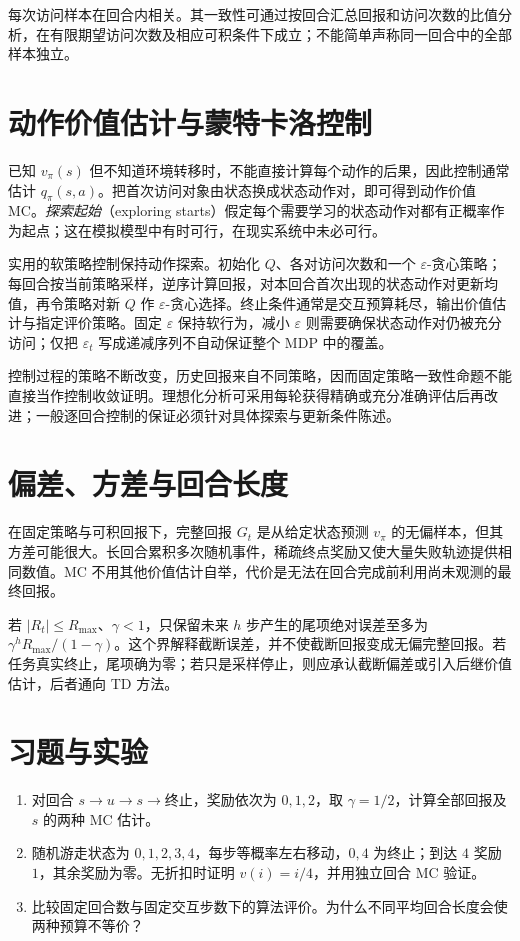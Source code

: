 \documentclass[UTF8,12pt,a4paper,fontset=fandol]{ctexbook}
\begin{document}
每次访问样本在回合内相关。其一致性可通过按回合汇总回报和访问次数的比值分析，在有限期望访问次数及相应可积条件下成立；不能简单声称同一回合中的全部样本独立。

\section{动作价值估计与蒙特卡洛控制}

已知 $v_\pi(s)$ 但不知道环境转移时，不能直接计算每个动作的后果，因此控制通常估计 $q_\pi(s,a)$。把首次访问对象由状态换成状态动作对，即可得到动作价值 MC。\emph{探索起始}（exploring starts）假定每个需要学习的状态动作对都有正概率作为起点；这在模拟模型中有时可行，在现实系统中未必可行。

实用的软策略控制保持动作探索。初始化 $Q$、各对访问次数和一个 $\varepsilon$-贪心策略；每回合按当前策略采样，逆序计算回报，对本回合首次出现的状态动作对更新均值，再令策略对新 $Q$ 作 $\varepsilon$-贪心选择。终止条件通常是交互预算耗尽，输出价值估计与指定评价策略。固定 $\varepsilon$ 保持软行为，减小 $\varepsilon$ 则需要确保状态动作对仍被充分访问；仅把 $\varepsilon_t$ 写成递减序列不自动保证整个 MDP 中的覆盖。

控制过程的策略不断改变，历史回报来自不同策略，因而固定策略一致性命题不能直接当作控制收敛证明。理想化分析可采用每轮获得精确或充分准确评估后再改进；一般逐回合控制的保证必须针对具体探索与更新条件陈述。

\section{偏差、方差与回合长度}

在固定策略与可积回报下，完整回报 $G_t$ 是从给定状态预测 $v_\pi$ 的无偏样本，但其方差可能很大。长回合累积多次随机事件，稀疏终点奖励又使大量失败轨迹提供相同数值。MC 不用其他价值估计自举，代价是无法在回合完成前利用尚未观测的最终回报。

若 $|R_t|\leq R_{\max}$、$\gamma<1$，只保留未来 $h$ 步产生的尾项绝对误差至多为 $\gamma^hR_{\max}/(1-\gamma)$。这个界解释截断误差，并不使截断回报变成无偏完整回报。若任务真实终止，尾项确为零；若只是采样停止，则应承认截断偏差或引入后继价值估计，后者通向 TD 方法。

\section{习题与实验}
\begin{enumerate}
\item 对回合 $s\to u\to s\to\text{终止}$，奖励依次为 $0,1,2$，取 $\gamma=1/2$，计算全部回报及 $s$ 的两种 MC 估计。
\item 随机游走状态为 $0,1,2,3,4$，每步等概率左右移动，$0,4$ 为终止；到达 $4$ 奖励 $1$，其余奖励为零。无折扣时证明 $v(i)=i/4$，并用独立回合 MC 验证。
\item 比较固定回合数与固定交互步数下的算法评价。为什么不同平均回合长度会使两种预算不等价？
\end{enumerate}
\end{document}
